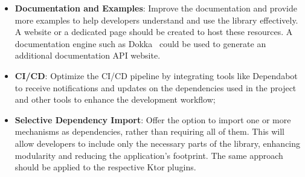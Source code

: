 \begin{itemize}
    \item \textbf{Documentation and Examples}:
    Improve the documentation
    and provide more examples to help developers understand and use the library effectively.
    A website or a dedicated page should be created
    to host these resources.
    A documentation engine such as Dokka~\cite{dokka} could be used to generate an additional documentation API website.
    \item \textbf{CI/CD}:
    Optimize the CI/CD pipeline by integrating tools like Dependabot~\cite{github-dependabot} to receive notifications and updates on the dependencies used in the project and other tools to enhance the development workflow;
    \item \textbf{Selective Dependency Import}:
    Offer the option to import one or more mechanisms as dependencies, rather than requiring all of them.
    This will allow developers to include only the necessary parts of the library, enhancing modularity and reducing the application's footprint.
    The same approach should be applied to the respective Ktor plugins.
\end{itemize}
